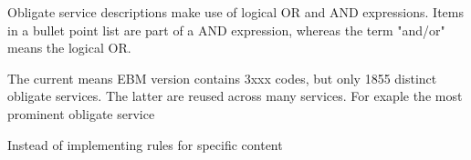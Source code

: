 Obligate service descriptions make use of logical OR and AND expressions.
Items in a bullet point list are part of a AND expression, whereas the term "and/or" means the logical OR.

The current means EBM version contains 3xxx codes, but only 1855 distinct obligate services.
The latter are reused across many services. For exaple the most prominent obligate service

Instead of implementing rules for specific content
